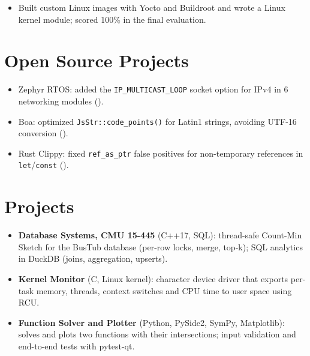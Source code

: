 \documentclass[10pt]{article}
\begin{document}
\begin{itemize}
  \item Built custom Linux images with Yocto and Buildroot and wrote a Linux kernel module; scored 100\% in the final evaluation.
\end{itemize}

\section*{Open Source Projects}
\begin{itemize}
  \item Zephyr RTOS: added the \texttt{IP\_MULTICAST\_LOOP} socket option for IPv4 in 6 networking modules ().
  \item Boa: optimized \texttt{JsStr::code\_points()} for Latin1 strings, avoiding UTF-16 conversion ().
  \item Rust Clippy: fixed \texttt{ref\_as\_ptr} false positives for non-temporary references in \texttt{let}/\texttt{const} ().
\end{itemize}

\section*{Projects}
\begin{itemize}
  \item \textbf{Database Systems, CMU 15-445} (C++17, SQL): thread-safe Count-Min Sketch for the BusTub database (per-row locks, merge, top-k); SQL analytics in DuckDB (joins, aggregation, upserts). 
  \item \textbf{Kernel Monitor} (C, Linux kernel): character device driver that exports per-task memory, threads, context switches and CPU time to user space using RCU. 
  \item \textbf{Function Solver and Plotter} (Python, PySide2, SymPy, Matplotlib): solves and plots two functions with their intersections; input validation and end-to-end tests with pytest-qt. 
\end{itemize}
\end{document}
